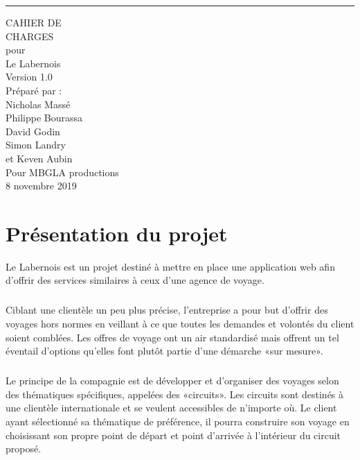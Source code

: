 \documentclass{scrreprt}
\def\myversion{1.0}
\def\projectname{Le Labernois}
\begin{document}
\begin{flushright}
    \rule{16cm}{5pt}\vskip1cm
    \begin{bfseries}
        \Huge{CAHIER DE \\ CHARGES}\\
        \vspace{1.5cm}
        pour\\
        \vspace{1.5cm}
        \projectname\\
        \vspace{1.5cm}
        \LARGE{Version \myversion}\\
        \vspace{1.5cm}
        Préparé par :\\
        Nicholas Massé\\
        Philippe Bourassa\\
        David Godin\\
        Simon Landry\\
        et Keven Aubin\\
        \vspace{1cm}
        Pour MBGLA productions\\
        \vspace{.5cm}
        8 novembre 2019\\
    \end{bfseries}
\end{flushright}
\newpage
{}
\tableofcontents
\newpage
{}
\chapter{Présentation du projet}

\projectname{} est un projet destiné à mettre en place une application
web afin d'offrir des services similaires à ceux d'une agence de voyage.

\paragraph{}
Ciblant une clientèle un peu plus précise, l'entreprise a pour but
d'offrir des voyages hors normes en veillant à ce que toutes les
demandes et volontés du client soient comblées. Les offres de voyage
ont un air standardisé mais offrent un tel éventail d'options qu'elles
font plutôt partie d'une démarche «sur mesure».

\paragraph{}
Le principe de la compagnie est de développer et d'organiser des
voyages selon des thématiques spécifiques, appelées des «circuits». Les
circuits sont destinés à une clientèle internationale et se veulent
accessibles de n'importe où. Le client ayant sélectionné sa thématique
de préférence, il pourra construire son voyage en choisissant son
propre point de départ et point d'arrivée à l'intérieur du circuit
proposé.
\end{document}
